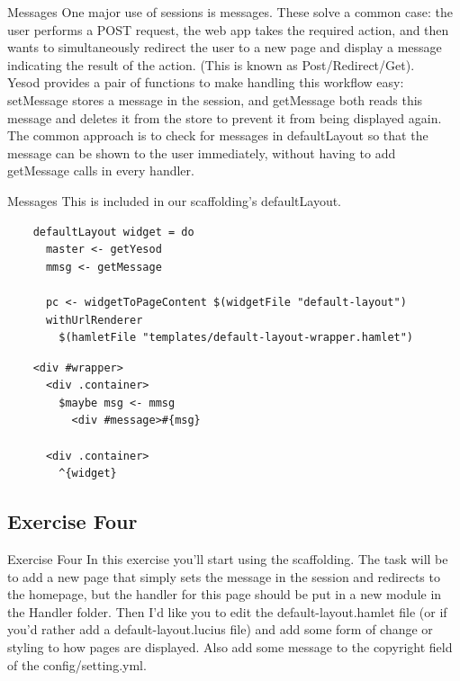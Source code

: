 \documentclass[pdf]{beamer}
\begin{document}
\begin{frame}{Messages}
  One major use of sessions is messages. These solve a common case:
  the user performs a POST request, the web app takes the required
  action, and then wants to simultaneously redirect the user to a new
  page and display a message indicating the result of the
  action. (This is known as Post/Redirect/Get). \\

  Yesod provides a pair of functions to make handling this workflow
  easy: setMessage stores a message in the session, and getMessage
  both reads this message and deletes it from the store to prevent it
  from being displayed again. \\

  The common approach is to check for messages in defaultLayout so
  that the message can be shown to the user immediately, without
  having to add getMessage calls in every handler.
\end{frame}

\begin{frame}[fragile]{Messages}
  This is included in our scaffolding's defaultLayout. \\

  \begin{verbatim}
    defaultLayout widget = do
      master <- getYesod
      mmsg <- getMessage

      pc <- widgetToPageContent $(widgetFile "default-layout")
      withUrlRenderer
        $(hamletFile "templates/default-layout-wrapper.hamlet")
  \end{verbatim}
  \vspace{0.5em}
  \begin{verbatim}
    <div #wrapper>
      <div .container>
        $maybe msg <- mmsg
          <div #message>#{msg}

      <div .container>
        ^{widget}
  \end{verbatim}
\end{frame}

\subsection{Exercise Four}
\begin{frame}[fragile]{Exercise Four}
  In this exercise you'll start using the scaffolding. The task will
  be to add a new page that simply sets the message in the session and
  redirects to the homepage, but the handler for this page should be
  put in a new module in the Handler folder. Then I'd like you to edit
  the default-layout.hamlet file (or if you'd rather add a
  default-layout.lucius file) and add some form of change or styling
  to how pages are displayed. Also add some message to the copyright
  field of the config/setting.yml.
\end{frame}
\end{document}
